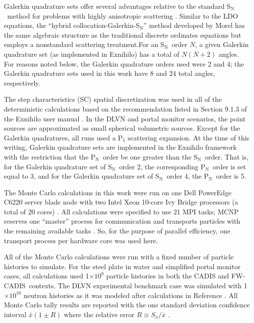 \documentclass{article} %
\newcommand{\sn}{S$_\mathrm{N}$}
\newcommand{\pn}{P$_\mathrm{N}$}
\newcommand{\xbar}{\ensuremath{\bar{x}}}
\newcommand{\E}[1]{$\times10^{#1}$}
\newcommand{\fwc}{\mbox{FW-CADIS}}
\begin{document}
Galerkin quadrature sets offer several advantages relative to the standard \sn\
method for problems with highly anisotropic scattering \cite{morel}. Similar to
the LDO equations, the ``hybrid collocation-Galerkin-S$_\mathrm{N}$'' method
developed by Morel has the same algebraic structure as the traditional discrete
ordinates equations but employs a nonstandard scattering treatment.For
an \sn\ order $N$, a given Galerkin quadrature set (as implemented in Exnihilo)
has a total of $N(N+2)$ angles. For reasons noted below, the Galerkin quadrature
orders used were 2 and 4; the Galerkin quadrature sets
used in this work have 8 and 24 total angles, respectively.

The step characteristics (SC) spatial discretization was used in all of the
deterministic calculations based on the recommendation listed in Section 9.1.3
of the Exnihilo user manual \cite{exum}. In the DLVN and portal monitor
scenarios, the point sources are approximated as small spherical volumetric
sources. Except for the Galerkin quadratures, all runs used a P$_5$ scattering
expansion. At the time of this writing, Galerkin quadrature sets are
implemented in the Exnihilo framework with the restriction that the \pn\ order
be one greater than the \sn\ order. That is, for the Galerkin quadrature set of
\sn\ order 2, the corresponding \pn\ order is set equal to 3, and for the
Galerkin quadrature set of \sn\ order 4, the \pn\ order is 5.

The Monte Carlo calculations in this work were run on one Dell PowerEdge C6220
server blade node with two Intel Xeon 10-core Ivy Bridge processors (a total of
20 cores) \cite{savio}. All calculations were specified to use 21 MPI tasks; MCNP
reserves one ``master'' process for communication and transports particles with
the remaining available tasks \cite{mcnp}. So, for the purpose of parallel
efficiency, one transport process per hardware core was used here.

All of the Monte Carlo calculations were run with a fixed number of particle 
histories to simulate. For the steel plate in water and simplified portal 
monitor cases, all calculations used 1\E{9} particle histories in both the
CADIS and \fwc\ contexts. The DLVN experimental benchmark case was simulated 
with 1\E{10} neutron histories as it was modeled after calculations in
Reference \cite{sw-dlvn}. All Monte Carlo tally results are reported with the
one standard deviation confidence interval $\xbar(1\pm R)$ where the relative
error $R \equiv S_{\xbar}/\xbar$ \cite{mcnp}.
\end{document}
